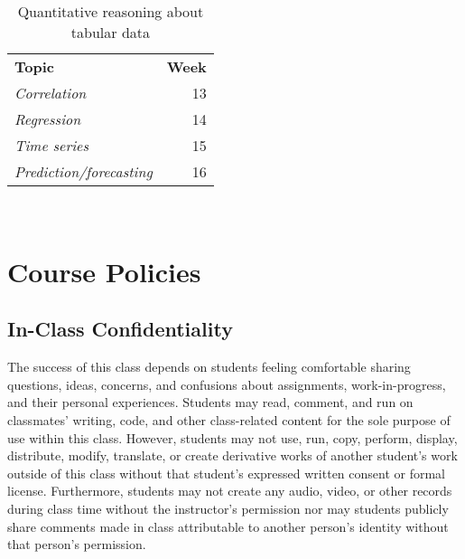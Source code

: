 \documentclass[10pt]{memoir}
\begin{document}
\begin{table}[htb!]
\centering
\begin{tabular}{lr}
    \textbf{Topic} & \textbf{Week} \\
    \cmidrule[.1em](lr){1-2}
    \textit{Correlation} & 13 \\ %
    \textit{Regression} & 14 \\ 
    \textit{Time series} & 15  \\ 
    \textit{Prediction/forecasting} & 16 
 \\
    \cmidrule[.1em](lr){1-2}
\end{tabular}\\
\caption{ Quantitative reasoning about tabular data}
\end{table}

\pagebreak

\section{Course Policies}


\subsection{In-Class Confidentiality}
The success of this class depends on students feeling comfortable sharing questions, ideas, concerns, and confusions about assignments, work-in-progress, and their personal experiences. Students may read, comment, and run on classmates' writing, code, and other class-related content for the sole purpose of use within this class. However, students may not use, run, copy, perform, display, distribute, modify, translate, or create derivative works of another student's work outside of this class without that student's expressed written consent or formal license. Furthermore, students may not create any audio, video, or other records during class time without the instructor's permission nor may students publicly share comments made in class attributable to another person's identity without that person's permission.
\end{document}

